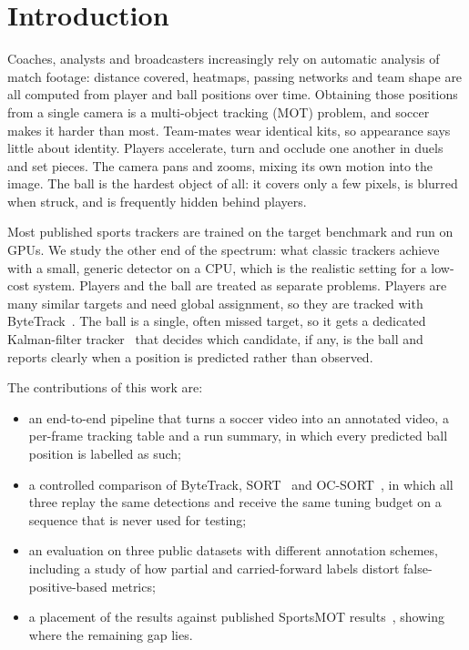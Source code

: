 \section{Introduction}
Coaches, analysts and broadcasters increasingly rely on automatic analysis of
match footage: distance covered, heatmaps, passing networks and team shape are
all computed from player and ball positions over time. Obtaining those
positions from a single camera is a multi-object tracking (MOT) problem, and
soccer makes it harder than most. Team-mates wear identical kits, so appearance
says little about identity. Players accelerate, turn and occlude one another in
duels and set pieces. The camera pans and zooms, mixing its own motion into the
image. The ball is the hardest object of all: it covers only a few pixels, is
blurred when struck, and is frequently hidden behind players.

Most published sports trackers are trained on the target benchmark and run on
GPUs. We study the other end of the spectrum: what classic trackers achieve with
a small, generic detector on a CPU, which is the realistic setting for a
low-cost system. Players and the ball are treated as separate problems. Players
are many similar targets and need global assignment, so they are tracked with
ByteTrack~\cite{bytetrack}. The ball is a single, often missed target, so it gets
a dedicated Kalman-filter tracker~\cite{kalman} that decides which candidate, if
any, is the ball and reports clearly when a position is predicted rather than
observed.

The contributions of this work are:
\begin{itemize}
\item an end-to-end pipeline that turns a soccer video into an annotated video, a
per-frame tracking table and a run summary, in which every predicted ball
position is labelled as such;
\item a controlled comparison of ByteTrack, SORT~\cite{sort} and
OC-SORT~\cite{ocsort}, in which all three replay the same detections and receive
the same tuning budget on a sequence that is never used for testing;
\item an evaluation on three public datasets with different annotation schemes,
including a study of how partial and carried-forward labels distort
false-positive-based metrics;
\item a placement of the results against published SportsMOT
results~\cite{sportsmot,deepeiou,diffmot}, showing where the remaining gap lies.
\end{itemize}

